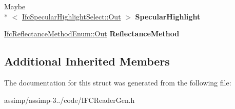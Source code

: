 \begin{DoxyCompactItemize}
\item 
\hypertarget{struct_assimp_1_1_i_f_c_1_1_ifc_surface_style_rendering_a82938ec246d592cd2c4999dc5bd25131}{\hyperlink{struct_assimp_1_1_s_t_e_p_1_1_maybe}{Maybe}\\*
$<$ \hyperlink{classboost_1_1shared__ptr}{Ifc\+Specular\+Highlight\+Select\+::\+Out} $>$ {\bfseries Specular\+Highlight}}\label{struct_assimp_1_1_i_f_c_1_1_ifc_surface_style_rendering_a82938ec246d592cd2c4999dc5bd25131}

\item 
\hypertarget{struct_assimp_1_1_i_f_c_1_1_ifc_surface_style_rendering_aabcec54aa9964e26cf5d8a4db2653ece}{\hyperlink{classboost_1_1shared__ptr}{Ifc\+Reflectance\+Method\+Enum\+::\+Out} {\bfseries Reflectance\+Method}}\label{struct_assimp_1_1_i_f_c_1_1_ifc_surface_style_rendering_aabcec54aa9964e26cf5d8a4db2653ece}

\end{DoxyCompactItemize}
\subsection*{Additional Inherited Members}


The documentation for this struct was generated from the following file\+:\begin{DoxyCompactItemize}
\item 
assimp/assimp-\/3../code/I\+F\+C\+Reader\+Gen.\+h\end{DoxyCompactItemize}
